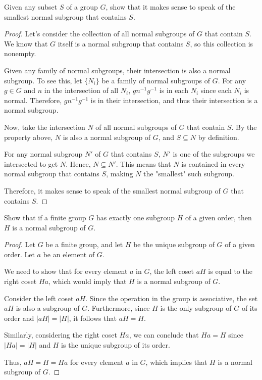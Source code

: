 \documentclass[12pt]{amsart}
\theoremstyle{definition}
\numberwithin{equation}{section}
\theoremstyle{plain}
\begin{document}
\begin{exercise}{32} Given any subset $S$ of a group $G$, show that it makes sense to speak of the smallest normal subgroup that contains $S$.
    
    \begin{proof}
    Let's consider the collection of all normal subgroups of \( G \) that contain \( S \). We know that \( G \) itself is a normal subgroup that contains \( S \), so this collection is nonempty.
    
    Given any family of normal subgroups, their intersection is also a normal subgroup. To see this, let \( \{ N_i \} \) be a family of normal subgroups of \( G \). For any \( g \in G \) and \( n \) in the intersection of all \( N_i \), \( gn^{-1}g^{-1} \) is in each \( N_i \) since each \( N_i \) is normal. Therefore, \( gn^{-1}g^{-1} \) is in their intersection, and thus their intersection is a normal subgroup.
    
    Now, take the intersection \( N \) of all normal subgroups of \( G \) that contain \( S \). By the property above, \( N \) is also a normal subgroup of \( G \), and \( S \subseteq N \) by definition.
    
    For any normal subgroup \( N' \) of \( G \) that contains \( S \), \( N' \) is one of the subgroups we intersected to get \( N \). Hence, \( N \subseteq N' \). This means that \( N \) is contained in every normal subgroup that contains \( S \), making \( N \) the "smallest" such subgroup.
    
    Therefore, it makes sense to speak of the smallest normal subgroup of \( G \) that contains \( S \).
    \end{proof}
\end{exercise}
\vspace*{20pt}
\begin{exercise}{34} Show that if a finite group $G$ has exactly one subgroup $H$ of a given order, then $H$ is a normal subgroup of $G$.

    \begin{proof}
    Let \( G \) be a finite group, and let \( H \) be the unique subgroup of \( G \) of a given order. Let \( a \) be an element of \( G \).
    
    We need to show that for every element \( a \) in \( G \), the left coset \( aH \) is equal to the right coset \( Ha \), which would imply that \( H \) is a normal subgroup of \( G \).
    
    Consider the left coset \( aH \). Since the operation in the group is associative, the set \( aH \) is also a subgroup of \( G \). Furthermore, since \( H \) is the only subgroup of \( G \) of its order and \( |aH| = |H| \), it follows that \( aH = H \).
    
    Similarly, considering the right coset \( Ha \), we can conclude that \( Ha = H \) since \( |Ha| = |H| \) and \( H \) is the unique subgroup of its order.
    
    Thus, \( aH = H = Ha \) for every element \( a \) in \( G \), which implies that \( H \) is a normal subgroup of \( G \).
    \end{proof}
\end{exercise}
\end{document}
